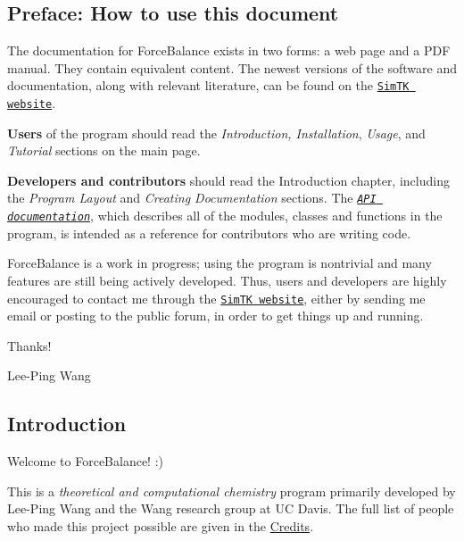 \hypertarget{index_preface_sec}{}\subsection{Preface\+: How to use this document}\label{index_preface_sec}
The documentation for Force\+Balance exists in two forms\+: a web page and a P\+DF manual. They contain equivalent content. The newest versions of the software and documentation, along with relevant literature, can be found on the \href{https://simtk.org/home/forcebalance/}{\tt Sim\+TK website}.

{\bfseries Users} of the program should read the {\itshape Introduction, Installation}, {\itshape Usage}, and {\itshape Tutorial} sections on the main page.

{\bfseries Developers and contributors} should read the Introduction chapter, including the {\itshape Program Layout} and {\itshape Creating Documentation} sections. The {\itshape \href{http://leeping.github.io/forcebalance/doc/html/api/roadmap.html}{\tt A\+PI documentation}}, which describes all of the modules, classes and functions in the program, is intended as a reference for contributors who are writing code.

Force\+Balance is a work in progress; using the program is nontrivial and many features are still being actively developed. Thus, users and developers are highly encouraged to contact me through the \href{https://simtk.org/home/forcebalance/}{\tt Sim\+TK website}, either by sending me email or posting to the public forum, in order to get things up and running.

Thanks!

Lee-\/\+Ping Wang\hypertarget{index_intro_sec}{}\subsection{Introduction}\label{index_intro_sec}
Welcome to Force\+Balance! \+:)

This is a {\itshape  theoretical and computational chemistry } program primarily developed by Lee-\/\+Ping Wang and the Wang research group at UC Davis. The full list of people who made this project possible are given in the \hyperlink{index_credits}{Credits}.

